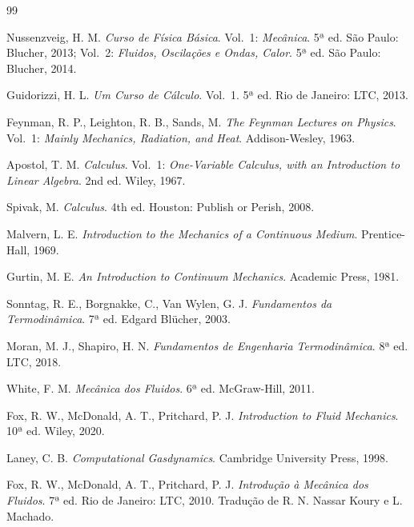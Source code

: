 \documentclass[12pt,a4paper]{article}
\numberwithin{equation}{section}
\numberwithin{table}{section}
\numberwithin{figure}{section}
\begin{document}
{\newpage

\clearpage
{}
{}
\begin{thebibliography}{99}

 Nussenzveig, H. M. \textit{Curso de Física Básica}. Vol.~1: \textit{Mecânica}. 5ª ed. São Paulo: Blucher, 2013; Vol.~2: \textit{Fluidos, Oscilações e Ondas, Calor}. 5ª ed. São Paulo: Blucher, 2014.

 Guidorizzi, H. L. \textit{Um Curso de Cálculo}. Vol.~1. 5ª ed. Rio de Janeiro: LTC, 2013.

 Feynman, R. P., Leighton, R. B., Sands, M. \textit{The Feynman Lectures on Physics}. Vol.~1: \textit{Mainly Mechanics, Radiation, and Heat}. Addison-Wesley, 1963.

 Apostol, T. M. \textit{Calculus}. Vol.~1: \textit{One-Variable Calculus, with an Introduction to Linear Algebra}. 2nd ed. Wiley, 1967.

 Spivak, M. \textit{Calculus}. 4th ed. Houston: Publish or Perish, 2008.

 Malvern, L. E. \textit{Introduction to the Mechanics of a Continuous Medium}. Prentice-Hall, 1969.

 Gurtin, M. E. \textit{An Introduction to Continuum Mechanics}. Academic Press, 1981.

 Sonntag, R. E., Borgnakke, C., Van Wylen, G. J. \textit{Fundamentos da Termodinâmica}. 7ª ed. Edgard Blücher, 2003.

 Moran, M. J., Shapiro, H. N. \textit{Fundamentos de Engenharia Termodinâmica}. 8ª ed. LTC, 2018.

 White, F. M. \textit{Mecânica dos Fluidos}. 6ª ed. McGraw-Hill, 2011.

 Fox, R. W., McDonald, A. T., Pritchard, P. J. \textit{Introduction to Fluid Mechanics}. 10ª ed. Wiley, 2020.

 Laney, C. B. \textit{Computational Gasdynamics}. Cambridge University Press, 1998.

 Fox, R. W., McDonald, A. T., Pritchard, P. J. \textit{Introdução à Mecânica dos Fluidos}. 7ª ed. Rio de Janeiro: LTC, 2010. Tradução de R. N. Nassar Koury e L. Machado.


\end{thebibliography}}
\end{document}
